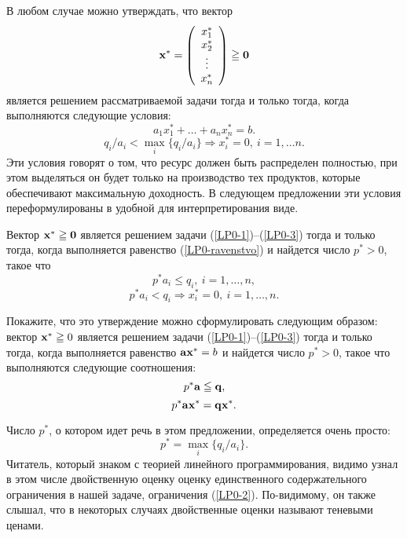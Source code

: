     В любом случае можно утверждать, что вектор
    \[\mathbf{x^{*}}=\left(
     \begin{array}{c}
        x_{1}^{*} \\
        x_{2}^{*} \\
        \vdots \\
        x_{n}^{*}  \\
      \end{array}
\right)\geqq\mathbf{0}\]
    является решением рассматриваемой задачи тогда и только тогда,
    когда выполняются следующие условия:
\begin{equation}
    \label{LP0-ravenstvo}
    a_{1}x_{1}^{*}+\ldots+a_{n}x_{n}^{*}=b.
\end{equation}
    \[q_{i}/a_{i}<\max_{i}\{q_{i}/a_{i}\}\Rightarrow x_{i}^{*}=0,
     \ i=1,\ldots n.\]
    Эти условия говорят о том, что ресурс должен быть распределен
    полностью, при этом выделяться он будет только на производство тех продуктов,
    которые обеспечивают максимальную доходность. В следующем
    предложении эти условия переформулированы в удобной для
    интерпретирования виде.

    \begin{prop}
    \label{LP0-usloviya-optimalnosti}
    Вектор  $\mathbf{x^{*}}\geqq\mathbf{0}$
    является решением задачи (\ref{LP0-1})--(\ref{LP0-3})
    тогда и только тогда, когда выполняется равенство (\ref{LP0-ravenstvo})
    и найдется число $p^{*}>0$, такое что
    \[p^{*}a_{i}\leqslant q_{i},\ i=1,\ldots, n,\]
    \[p^{*}a_{i}< q_{i} \Rightarrow x_{i}^{*}=0, \ i=1,\ldots, n.\]
    \end{prop}

\begin{exer}
    Покажите, что это утверждение можно сформулировать следующим образом:
    вектор  $\mathbf{x^{*}}\geqq0$
    является решением задачи (\ref{LP0-1})--(\ref{LP0-3})
    тогда и только тогда, когда выполняется равенство
    $\mathbf{a}\mathbf{x^{*}}=b$ и найдется число $p^{*}>0$, такое что
    выполняются следующие соотношения:
    \[p^{*}\mathbf{a}\leqq\mathbf{q},\]
    \[p^{*}\mathbf{a}\mathbf{x^{*}}=\mathbf{q}\mathbf{x^{*}}.\]
\end{exer}

    Число $p^{*}$, о котором идет речь в этом предложении,
    определяется очень просто:
    \[p^{*}=\max_{i}\{q_{i}/a_{i}\}.\]
    Читатель, который знаком с теорией линейного программирования,
    видимо узнал в этом числе двойственную оценку оценку
    единственного содержательного ограничения в
    нашей задаче, ограничения (\ref{LP0-2}). По-видимому, он также
    слышал, что в некоторых случаях двойственные
    оценки называют теневыми ценами.

